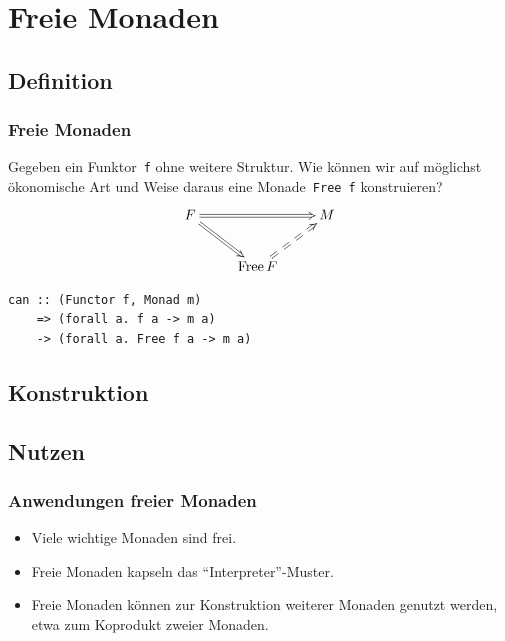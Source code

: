 \documentclass[12pt,compress,ngerman,utf8,t]{beamer}
\begin{document}


\section{Freie Monaden}

\subsection{Definition}

\begin{frame}[fragile]\frametitle{Freie Monaden}
  Gegeben ein Funktor~\texttt{f} ohne weitere Struktur. Wie können wir auf
  möglichst ökonomische Art und Weise daraus eine
  Monade~\texttt{Free f} konstruieren?
  \[ \xymatrix{
    F \ar@{=>}[rr] \ar@{=>}[rd] && M \\
    & \operatorname{Free} F \ar@{==>}[ru]
  } \]
  \begin{verbatim}
can :: (Functor f, Monad m)
    => (forall a. f a -> m a)
    -> (forall a. Free f a -> m a)
  \end{verbatim}
\end{frame}


\subsection{Konstruktion}




\subsection{Nutzen}

\begin{frame}\frametitle{Anwendungen freier Monaden}
  \begin{itemize}
    \item Viele wichtige Monaden sind frei.
    \item Freie Monaden kapseln das "`Interpreter"'-Muster.
    \item Freie Monaden können zur Konstruktion weiterer Monaden genutzt
    werden, etwa zum Koprodukt zweier Monaden.
  \end{itemize}
\end{frame}
\end{document}
